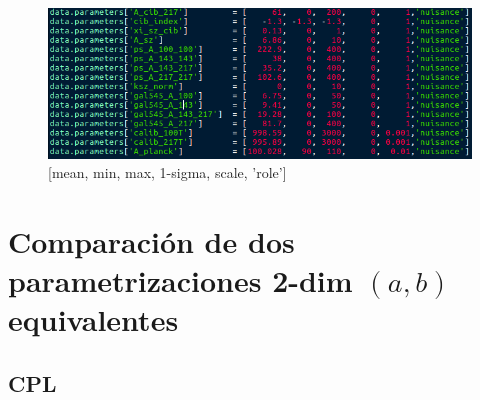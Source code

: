 \documentclass[a4paper,10pt]{article}
\begin{document}
\begin{enumerate}
\begin{figure}[h]
 \centering
 \includegraphics[scale=0.6]{planck_nuisance_parameters.png}
 \caption{\footnotesize{[mean, min, max, 1-sigma, scale, 'role']}}
\end{figure}


\end{enumerate}

\section{Comparación de dos parametrizaciones 2-dim $(a,b)$ equivalentes} %
\subsection{CPL}
\end{document}
